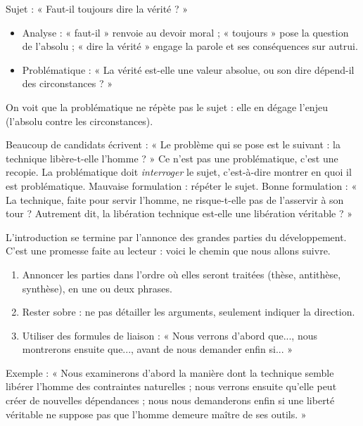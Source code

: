 \documentclass[11pt]{article}
\newcounter{popsec}
\newcounter{popsub}
\newcommand{\courssub}[1]{%
  \stepcounter{popsub}%
  \par\vspace{9pt}\noindent{\popxbold\fontsize{11.5}{13}\selectfont\color{popink}{\color{poporange}\thepopsec.\thepopsub}\hspace{6pt}#1}\par\nopagebreak\vspace{4pt}
}
\begin{document}
\begin{exemplebox}
Sujet : « Faut-il toujours dire la vérité ? »
\begin{itemize}
\item Analyse : « faut-il » renvoie au devoir moral ; « toujours » pose la question de l'absolu ; « dire la vérité » engage la parole et ses conséquences sur autrui.
\item Problématique : « La vérité est-elle une valeur absolue, ou son dire dépend-il des circonstances ? »
\end{itemize}
On voit que la problématique ne répète pas le sujet : elle en dégage l'enjeu (l'absolu contre les circonstances).
\end{exemplebox}

\begin{attention}
Beaucoup de candidats écrivent : « Le problème qui se pose est le suivant : la technique libère-t-elle l'homme ? » Ce n'est pas une problématique, c'est une recopie. La problématique doit \emph{interroger} le sujet, c'est-à-dire montrer en quoi il est problématique. Mauvaise formulation : répéter le sujet. Bonne formulation : « La technique, faite pour servir l'homme, ne risque-t-elle pas de l'asservir à son tour ? Autrement dit, la libération technique est-elle une libération véritable ? »
\end{attention}

\courssub{Quatrième étape : l'annonce du plan}

L'introduction se termine par l'annonce des grandes parties du développement. C'est une promesse faite au lecteur : voici le chemin que nous allons suivre.

\begin{methode}
\begin{enumerate}
\item Annoncer les parties dans l'ordre où elles seront traitées (thèse, antithèse, synthèse), en une ou deux phrases.
\item Rester sobre : ne pas détailler les arguments, seulement indiquer la direction.
\item Utiliser des formules de liaison : « Nous verrons d'abord que..., nous montrerons ensuite que..., avant de nous demander enfin si... »
\end{enumerate}
\end{methode}

Exemple : « Nous examinerons d'abord la manière dont la technique semble libérer l'homme des contraintes naturelles ; nous verrons ensuite qu'elle peut créer de nouvelles dépendances ; nous nous demanderons enfin si une liberté véritable ne suppose pas que l'homme demeure maître de ses outils. »
\end{document}
